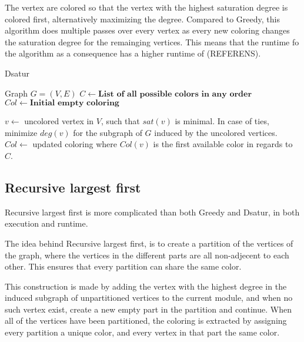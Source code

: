 \documentclass{amsart}
\begin{document}
The vertex are colored so that the vertex with the highest saturation degree is
colored first, alternatively maximizing the degree. Compared to Greedy, this
algorithm does multiple passes over every vertex as every new coloring changes
the saturation degree for the remainging vertices. This means that the runtime
fo  the algorithm as a consequence has a higher runtime of (REFERENS).

\begin{algorithm}[H]
  \caption{Dsatur}
  \label{alg:modmin}
  \begin{algorithmic}[1]
      \REQUIRE Graph $G = (V,E)$
      \STATE $C \leftarrow \textbf{List of all possible colors in any order}$
      \STATE $Col \leftarrow \textbf{Initial empty coloring}$


        \STATE $v \leftarrow$ uncolored vertex in $V$, such that $sat(v)$ is
        minimal. In case of ties, minimize $deg(v)$ for the subgraph of $G$
        induced by the uncolored vertices.
        \STATE $Col \leftarrow$ updated coloring where $Col(v)$ is the first
        available color in regards to $C$.
      \ENDFOR
  \end{algorithmic}
\end{algorithm}

\subsection{Recursive largest first}

Recursive largest first is more complicated than both Greedy and Dsatur, in both
execution and runtime. 

The idea behind Recursive largest first, is to create a partition of the
vertices of the graph, where the vertices in the different parts are all
non-adjecent to each other. This ensures that every partition can share the
same color. 

This construction is made by adding the vertex with the highest degree in the
induced subgraph of unpartitioned vertices to the current module, and when no
such vertex exist, create a new empty part in the partition and continue. When
all of the vertices have been partitioned, the coloring is extracted by
assigning every partition a unique color, and every vertex in that part the same
color.
\end{document}
